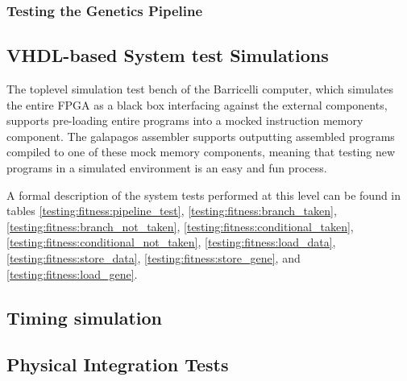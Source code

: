 \subsubsection{Testing the Genetics Pipeline}


\subsection{\gls{VHDL}-based System test Simulations}
\label{section:testing:fpga:system-tests}

The toplevel simulation test bench of the Barricelli computer, which simulates the entire FPGA as a black box interfacing against the external components, supports pre-loading entire programs into a mocked instruction memory component.
The \Gls{galapagos assembler} supports outputting assembled programs compiled to one of these mock memory components, meaning that testing new programs in a simulated environment is an easy and fun process.


A formal description of the system tests performed at this level can be found in tables
\ref{testing:fitness:pipeline_test},
\ref{testing:fitness:branch_taken},
\ref{testing:fitness:branch_not_taken},
\ref{testing:fitness:conditional_taken},
\ref{testing:fitness:conditional_not_taken},
\ref{testing:fitness:load_data},
\ref{testing:fitness:store_data},
\ref{testing:fitness:store_gene},
and
\ref{testing:fitness:load_gene}.














\subsection{Timing simulation}





\subsection{Physical Integration Tests}

